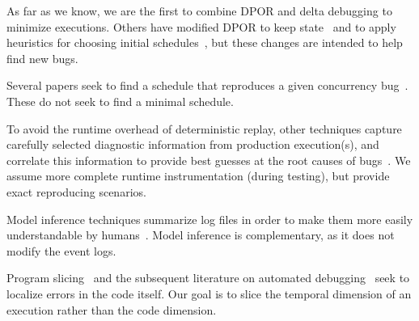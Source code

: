 As far as we know, we are the first to combine DPOR and delta debugging to
minimize executions. Others have modified DPOR to keep state~\cite{yang2008efficient,yi2006stateful}
and to apply heuristics for choosing initial schedules~\cite{lauterburg2010evaluating}, but these
changes are intended to help find new bugs.


 Several papers seek to find a schedule that
reproduces a given concurrency bug~\cite{zamfir2011debug,Zamfir:2010:EST:1755913.1755946,altekar2009odr,park2009pres}.
These do not seek to find a minimal schedule.

 To avoid the runtime overhead of deterministic replay, other techniques
capture carefully selected diagnostic information from production execution(s), and correlate this information
to provide best guesses at the root causes of
bugs~\cite{barham2004using,Chen02pinpoint:problem,Yuan:2010:SED:1736020.1736038,kasikci2015failure,sangmin}.
We assume more complete runtime instrumentation (during testing), but provide exact reproducing
scenarios.

 Model inference techniques summarize log files
in order to make them more easily understandable by
humans~\cite{ernst2001dynamically,synoptic,csight,biermann1972synthesis,lorenzoli2008automatic,lou2010mining}.
Model inference is complementary, as it does not modify the event logs. %

 Program slicing~\cite{weiser1981program}
and the subsequent literature on automated
debugging~\cite{zhangzhang,jose11,coverage_localization,xuan14,zeller2005,comparative_causality}
seek to localize errors in the code itself.
Our goal is to slice the temporal dimension of an execution rather than the
code dimension.

%

